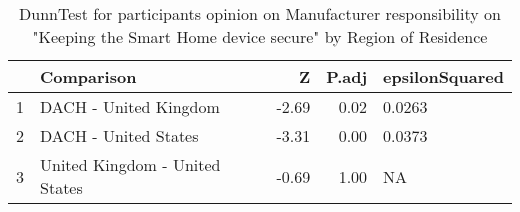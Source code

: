 \begin{table}[ht]
\centering
\begin{tabular}{rlrrl}
  \hline
 & Comparison & Z & P.adj & epsilonSquared \\ 
  \hline
1 & DACH - United Kingdom & -2.69 & 0.02 & 0.0263 \\ 
  2 & DACH - United States & -3.31 & 0.00 & 0.0373 \\ 
  3 & United Kingdom - United States & -0.69 & 1.00 & NA \\ 
   \hline
\end{tabular}
\caption{DunnTest for participants opinion on Manufacturer responsibility on "Keeping the Smart Home device secure" by Region of Residence} 
\end{table}

